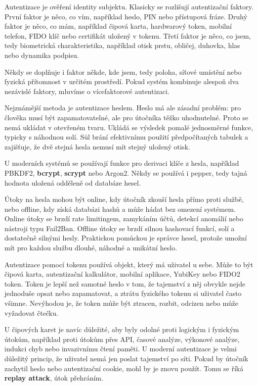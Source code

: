 \documentclass[11pt,a4paper]{article}
\begin{document}
Autentizace je ověření identity subjektu. Klasicky se rozlišují autentizační faktory. První faktor je něco, co vím, například heslo, PIN nebo přístupová fráze. Druhý faktor je něco, co mám, například čipová karta, hardwarový token, mobilní telefon, FIDO klíč nebo certifikát uložený v tokenu. Třetí faktor je něco, co jsem, tedy biometrická charakteristika, například otisk prstu, obličej, duhovka, hlas nebo dynamika podpisu.

Někdy se doplňuje i faktor někde, kde jsem, tedy poloha, síťové umístění nebo fyzická přítomnost v určitém prostředí. Pokud systém kombinuje alespoň dva nezávislé faktory, mluvíme o vícefaktorové autentizaci.

Nejznámější metoda je autentizace heslem. Heslo má ale zásadní problém: pro člověka musí být zapamatovatelné, ale pro útočníka těžko uhodnutelné. Proto se nemá ukládat v otevřeném tvaru. Ukládá se výsledek pomalé jednosměrné funkce, typicky s náhodnou solí. Sůl brání efektivnímu použití předpočítaných tabulek a zajišťuje, že dvě stejná hesla nemusí mít stejný uložený otisk.

U moderních systémů se používají funkce pro derivaci klíče z hesla, například PBKDF2, \textbf{bcrypt}, \textbf{scrypt} nebo Argon2. Někdy se používá i pepper, tedy tajná hodnota uložená odděleně od databáze hesel.

Útoky na hesla mohou být online, kdy útočník zkouší hesla přímo proti službě, nebo offline, kdy získá databázi hashů a může hádat bez omezení systémem. Online útoky se brzdí rate limitingem, zamykáním účtů, detekcí anomálií nebo nástroji typu Fail2Ban. Offline útoky se brzdí silnou hashovací funkcí, solí a dostatečně silnými hesly. Praktickou pomůckou je správce hesel, protože umožní mít pro každou službu dlouhé, náhodné a unikátní heslo.

Autentizace pomocí tokenu používá objekt, který má uživatel u sebe. Může to být čipová karta, autentizační kalkulátor, mobilní aplikace, YubiKey nebo FIDO2 token. Token je lepší než samotné heslo v tom, že tajemství z něj obvykle nejde jednoduše opsat nebo zapamatovat, a ztrátu fyzického tokenu si uživatel často všimne. Nevýhodou je, že token může být ztracen, rozbit, odcizen nebo může vyžadovat čtečku.

U čipových karet je navíc důležité, aby byly odolné proti logickým i fyzickým útokům, například proti útokům přes API, časové analýze, výkonové analýze, indukci chyb nebo invazivnímu čtení paměti. U moderní autentizace je velmi důležitý princip, že uživatel nemá jen poslat tajemství po síti. Pokud by útočník zachytil heslo nebo autentizační cookie, mohl by je znovu použít. Tomu se říká \textbf{replay attack}, útok přehráním.
\end{document}
